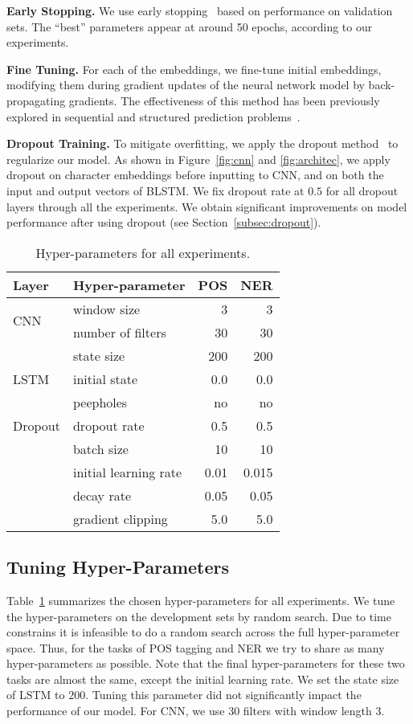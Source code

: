 \documentclass[11pt]{article}
\begin{document}
\noindent
\textbf{Early Stopping.} We use early stopping~\cite{giles2001,graves2013speech} based on performance on validation sets. The ``best'' parameters appear at around 50 epochs, according to our experiments.

\noindent
\textbf{Fine Tuning.} For each of the embeddings, we fine-tune initial embeddings, modifying them during gradient updates of the neural network model by back-propagating gradients. The effectiveness of this method has been previously explored in sequential and structured prediction problems~\cite{collobert2011natural,peng-dredze:2015:EMNLP}.

\noindent
\textbf{Dropout Training.} To mitigate overfitting, we apply the dropout method~\cite{srivastava2014dropout} to regularize our model. As shown in Figure~\ref{fig:cnn} and \ref{fig:architec}, we apply dropout on character embeddings before inputting to CNN, and on both the input and output vectors of BLSTM. We fix dropout rate at $0.5$ for all dropout layers through all the experiments. We obtain significant improvements on model performance after using dropout (see Section~\ref{subsec:dropout}).

\begin{table}
\centering
\begin{tabular}[t]{l|l|r|r}
\hline
\textbf{Layer} & \textbf{Hyper-parameter} & \textbf{POS} & \textbf{NER} \\
\hline
\multirow{2}{*}{CNN} & window size & 3 & 3 \\
 & number of filters & 30 & 30 \\
\hline
\multirow{3}{*}{LSTM} & state size & 200 & 200 \\
 & initial state & 0.0 & 0.0 \\
 & peepholes & no & no \\
\hline
Dropout & dropout rate & 0.5 & 0.5 \\
\hline
 & batch size & 10 & 10 \\
 & initial learning rate & 0.01 & 0.015 \\
 & decay rate & 0.05 & 0.05 \\
 & gradient clipping & 5.0 & 5.0 \\
\hline
\end{tabular}
\caption{Hyper-parameters for all experiments.}
\label{tab:hyper-params}
\end{table}

\subsection{Tuning Hyper-Parameters}
\label{subsec:hyper-params}
Table~\ref{tab:hyper-params} summarizes the chosen hyper-parameters for all experiments. We tune the hyper-parameters on the development sets by random search. Due to time constrains it is infeasible to do a random search across the full hyper-parameter space. Thus, for the tasks of POS tagging and NER we try to share as many hyper-parameters as possible. Note that the final hyper-parameters for these two tasks are almost the same, except the initial learning rate. We set the state size of LSTM to $200$. Tuning this parameter did not significantly impact the performance of our model. For CNN, we use 30 filters with window length 3. 
\end{document}
